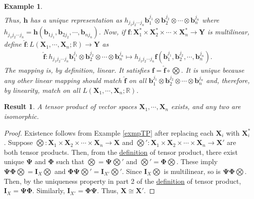 \documentclass[letterpaper,12pt]{article}
\theoremstyle{plain}
\newtheorem{res}{Result}
\theoremstyle{plain}
\newtheorem{exmp}{Example}
\theoremstyle{definition}
\begin{document}
\begin{exmp}
\begin{align*}
\end{align*}
Thus, $\mathbf{h}$ has a unique representation as $h_{j_1j_2\cdots j_n} \mathbf{b}_1^{j_1}\otimes \mathbf{b}_2^{j_2}\otimes \cdots \otimes \mathbf{b}_n^{j_n}$ where $h_{j_1j_2\cdots j_n} = \mathbf{h}(\mathbf{b}_{1j_1}, \mathbf{b}_{2j_2},\cdots, \mathbf{b}_{nj_n})$. Now, if $\mathbf{f}:\mathbf{X}_1^* \times \mathbf{X}_2^* \times \cdots \times \mathbf{X}_n^* \rightarrow \mathbf{Y}$ is multilinear, define $\hat{\mathbf{f}}: L(\mathbf{X}_1,\cdots,\mathbf{X}_n;\mathbb{R}) \rightarrow \mathbf{Y}$ as
\begin{align*}
\hat{\mathbf{f}}: h_{j_1j_2\cdots j_n} \mathbf{b}_1^{j_1}\otimes \mathbf{b}_2^{j_2}\otimes \cdots \otimes \mathbf{b}_n^{j_n} \mapsto  h_{j_1j_2\cdots j_n} \mathbf{f}\left(\mathbf{b}_1^{j_1},\mathbf{b}_2^{j_2}, \cdots, \mathbf{b}_n^{j_n} \right).
\end{align*}
The mapping is, by definition, linear. It satisfies $\mathbf{f}=\hat{\mathbf{f}}\circ \bigotimes$. It is unique because any other linear mapping should match $\hat{\mathbf{f}}$ on all $\mathbf{b}_1^{j_1}\otimes \mathbf{b}_2^{j_2}\otimes \cdots \otimes \mathbf{b}_n^{j_n}$ and, therefore, by linearity, match on all $L(\mathbf{X}_1,\cdots,\mathbf{X}_n;\mathbb{R})$. 
\end{exmp}

\begin{res} \label{resuniqtp} A tensor product of vector spaces $\mathbf{X}_1,\cdots,\mathbf{X}_n$ exists, and any two are isomorphic.
\end{res}
\begin{proof}
Existence follows from Example \ref{exmpTP} after replacing each $\mathbf{X}_i$ with $\mathbf{X}_i^*$. Suppose $\bigotimes:\mathbf{X}_1 \times \mathbf{X}_2 \times \cdots \times \mathbf{X}_n \rightarrow \mathbf{X}$ and $\bigotimes':\mathbf{X}_1 \times \mathbf{X}_2 \times \cdots \times \mathbf{X}_n \rightarrow \mathbf{X}'$ are both tensor products. Then, from the \hyperref[deftprod]{definition} of tensor product, there exist unique $\mathbf{\Psi}$ and $\mathbf{\Phi}$ such that $\bigotimes=\mathbf{\Psi}\bigotimes'$ and $\bigotimes'=\mathbf{\Phi}\bigotimes$. These imply $\mathbf{\Psi}\mathbf{\Phi}\bigotimes=\mathbf{I}_X\bigotimes$ and $\mathbf{\Phi}\mathbf{\Psi}\bigotimes'=\mathbf{I}_{X'}\bigotimes'$. Since $\mathbf{I}_X\bigotimes$ is multilinear, so is $\mathbf{\Psi}\mathbf{\Phi}\bigotimes$. Then, by the uniqueness property in part 2 of the \hyperref[deftprod]{definition} of tensor product, $\mathbf{I}_X=\mathbf{\Psi}\mathbf{\Phi}$. Similarly, $\mathbf{I}_{X'}=\mathbf{\Phi}\mathbf{\Psi}$. Thus, $\mathbf{X} \cong \mathbf{X}'.$
\end{proof}
\end{document}
